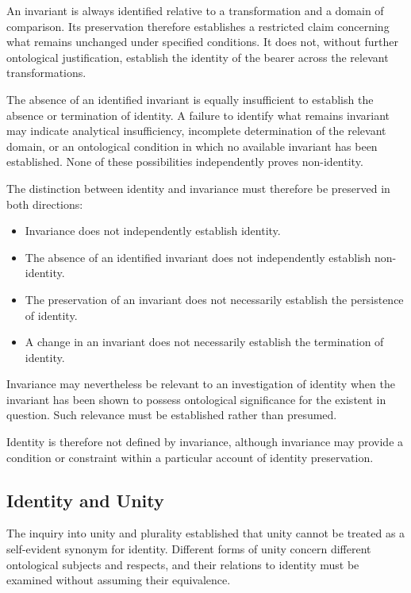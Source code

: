An invariant is always identified relative to a transformation
and a domain of comparison. Its preservation therefore
establishes a restricted claim concerning what remains
unchanged under specified conditions. It does not, without
further ontological justification, establish the identity of
the bearer across the relevant transformations.

The absence of an identified invariant is equally insufficient
to establish the absence or termination of identity. A
failure to identify what remains invariant may indicate
analytical insufficiency, incomplete determination of the
relevant domain, or an ontological condition in which no
available invariant has been established. None of these
possibilities independently proves non-identity.

The distinction between identity and invariance must therefore
be preserved in both directions:

\begin{itemize}
    \item Invariance does not independently establish identity.
    \item The absence of an identified invariant does not
    independently establish non-identity.
    \item The preservation of an invariant does not necessarily
    establish the persistence of identity.
    \item A change in an invariant does not necessarily
    establish the termination of identity.
\end{itemize}

Invariance may nevertheless be relevant to an investigation
of identity when the invariant has been shown to possess
ontological significance for the existent in question.
Such relevance must be established rather than presumed.

Identity is therefore not defined by invariance, although
invariance may provide a condition or constraint within a
particular account of identity preservation.


\subsection{Identity and Unity}

The inquiry into unity and plurality established that unity
cannot be treated as a self-evident synonym for identity.
Different forms of unity concern different ontological
subjects and respects, and their relations to identity must
be examined without assuming their equivalence.

